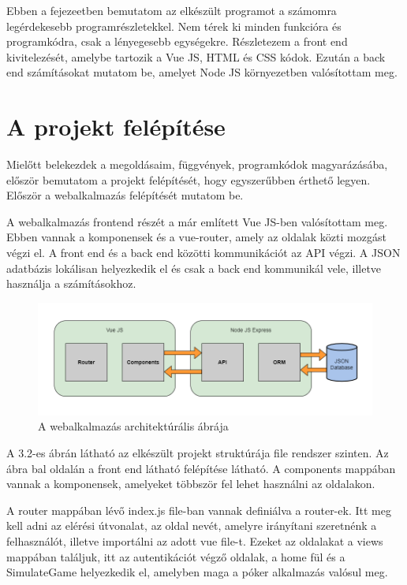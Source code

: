 Ebben a fejezeetben bemutatom az elkészült programot a számomra legérdekesebb programrészletekkel. Nem térek ki minden funkcióra és programkódra, csak a lényegesebb egységekre. Részletezem a front end kivitelezését, amelybe tartozik a Vue JS, HTML és CSS kódok. Ezután a back end számításokat mutatom be, amelyet Node JS környezetben valósítottam meg.

\section{A projekt felépítése}
Mielőtt belekezdek a megoldásaim, függvények, programkódok magyarázásába, először bemutatom a projekt felépítését, hogy egyszerűbben érthető legyen. Először a webalkalmazás felépítését mutatom be. 

A webalkalmazás frontend részét a már említett Vue JS-ben valósítottam meg. Ebben vannak a komponensek és a vue-router, amely az oldalak közti mozgást végzi el. A front end és a back end közötti kommunikációt az API végzi. A JSON adatbázis lokálisan helyezkedik el és csak a back end kommunikál vele, illetve használja a számításokhoz.

\begin{figure}[h]
\centering
\includegraphics[scale=0.8]{images/web-arch.png}
\caption{A webalkalmazás architektúrális ábrája}
\label{fig:web-arch}
\end{figure}

A 3.2-es ábrán látható az elkészült projekt struktúrája file rendszer szinten. Az ábra bal oldalán a front end látható felépítése látható. A components mappában vannak a komponensek, amelyeket többször fel lehet használni az oldalakon. 

A router mappában lévő index.js file-ban vannak definiálva a router-ek. Itt meg kell adni az elérési útvonalat, az oldal nevét, amelyre irányítani szeretnénk a felhasználót, illetve importálni az adott vue file-t. Ezeket az oldalakat a views mappában találjuk, itt az autentikációt végző oldalak, a home fül és a SimulateGame helyezkedik el, amelyben maga a póker alkalmazás valósul meg.

